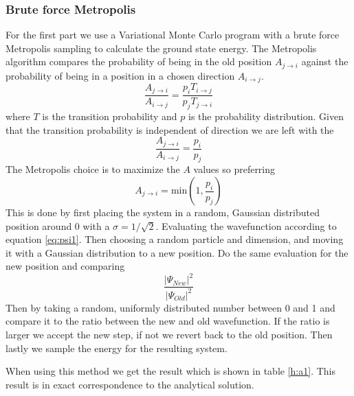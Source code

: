 \documentclass[12pt]{article}
\begin{document}
  \subsubsection{Brute force Metropolis}
  For the first part we use a Variational Monte Carlo program with a brute force Metropolis
  sampling to calculate the ground state energy. The Metropolis algorithm compares the 
  probability of being in the old position $A_{j\rightarrow i}$ against the probability
  of being in a position in a chosen direction $A_{i\rightarrow j}$.
  \begin{equation}
    \frac{A_{j\rightarrow i}}{A_{i\rightarrow j}} = %
    \frac{p_i T_{i\rightarrow j}}{p_j T_{j\rightarrow i}}
  \end{equation}
  where $T$ is the transition probability and $p$ is the probability distribution.
  Given that the transition probability is independent of direction we are left with the
  \begin{equation}
    \frac{A_{j\rightarrow i}}{A_{i\rightarrow j}} = %
    \frac{p_i}{p_j}
  \end{equation}
  The Metropolis choice is to maximize the $A$ values so preferring
  \begin{equation}
    A_{j\rightarrow i} = \text{min}\left(1,\frac{p_i}{p_j}\right)
  \end{equation}
  This is done by first placing the system in a random, Gaussian distributed position 
  around 0 with a $\sigma = 1/\sqrt{2}$. Evaluating the wavefunction according to 
  equation \ref{eq:psi1}. Then choosing a random particle and dimension, and moving 
  it with a Gaussian distribution to a new position. Do the same evaluation for the 
  new position and comparing
  \[\frac{|\Psi_{New}|^2}{|\Psi_{Old}|^2}\]
  Then by taking a random, uniformly distributed number between 0 and 1 and compare it
  to the ratio between the new and old wavefunction. If the ratio is larger we accept
  the new step, if not we revert back to the old position. Then lastly we sample the energy for
  the resulting system.
  
  When using this method we get the result which is shown in table \ref{h:a1}. This result is
  in exact correspondence to the analytical solution.
\end{document}
